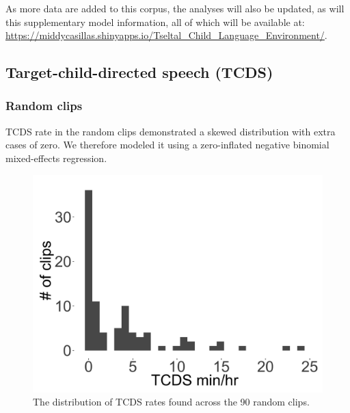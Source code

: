 \documentclass[floatsintext,man]{apa6}
\theoremstyle{definition}
\theoremstyle{definition}
\theoremstyle{definition}
\theoremstyle{remark}
\begin{document}
As more data are added to this corpus, the analyses will also be
updated, as will this supplementary model information, all of which will
be available at:
\url{https://middycasillas.shinyapps.io/Tseltal_Child_Language_Environment/}.

\subsection{Target-child-directed speech (TCDS)}\label{models-tcds}

\subsubsection{Random clips}\label{models-tcds-random}

TCDS rate in the random clips demonstrated a skewed distribution with
extra cases of zero. We therefore modeled it using a zero-inflated
negative binomial mixed-effects regression.

\FloatBarrier

\begin{figure}[H]

{\centering \includegraphics[width=0.4\linewidth]{www/TCDS_random_distribution} 

}

\caption{The distribution of TCDS rates found across the 90 random clips.}\label{fig:fig1}
\end{figure}

\FloatBarrier
\end{document}
